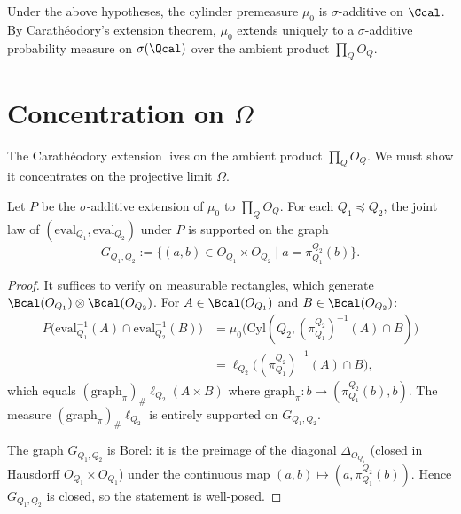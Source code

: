 \begin{corollary}
Under the above hypotheses, the cylinder premeasure $\mu_0$ is
$\sigma$-additive on $\Ccal$.  By Carath\'eodory's extension theorem,
$\mu_0$ extends uniquely to a $\sigma$-additive probability measure
on $\sigma(\Qcal)$ over the ambient product $\prod_Q O_Q$.
\end{corollary}

\section{Concentration on $\Omega$}\label{sec:concentration}

The Carath\'eodory extension lives on the ambient product
$\prod_Q O_Q$.  We must show it concentrates on the projective limit
$\Omega$.

\begin{lemma}
\label{lem:graph-support}
Let $P$ be the $\sigma$-additive extension of $\mu_0$ to
$\prod_Q O_Q$.  For each $Q_1 \preceq Q_2$, the joint law of
$(\mathrm{eval}_{Q_1}, \mathrm{eval}_{Q_2})$ under $P$ is supported
on the graph
\[
G_{Q_1,Q_2}
:=
\bigl\{
(a,b) \in O_{Q_1} \times O_{Q_2}
\;\big|\;
a = \pi^{Q_2}_{Q_1}(b)
\bigr\}.
\]
\end{lemma}

\begin{proof}
It suffices to verify on measurable rectangles, which generate
$\Bcal(O_{Q_1}) \otimes \Bcal(O_{Q_2})$.  For $A \in \Bcal(O_{Q_1})$
and $B \in \Bcal(O_{Q_2})$:
\begin{align*}
P\bigl(
\mathrm{eval}_{Q_1}^{-1}(A) \cap \mathrm{eval}_{Q_2}^{-1}(B)
\bigr)
&= \mu_0\bigl(\mathrm{Cyl}(Q_2, (\pi^{Q_2}_{Q_1})^{-1}(A) \cap B)\bigr) \\
&= \ell_{Q_2}\bigl((\pi^{Q_2}_{Q_1})^{-1}(A) \cap B\bigr),
\end{align*}
which equals $(\mathrm{graph}_\pi)_\# \ell_{Q_2}(A \times B)$
where $\mathrm{graph}_\pi : b \mapsto (\pi^{Q_2}_{Q_1}(b), b)$.
The measure $(\mathrm{graph}_\pi)_\# \ell_{Q_2}$ is entirely
supported on $G_{Q_1,Q_2}$.

The graph $G_{Q_1,Q_2}$ is Borel: it is the preimage of the diagonal
$\Delta_{O_{Q_1}}$ (closed in Hausdorff $O_{Q_1} \times O_{Q_1}$)
under the continuous map $(a,b) \mapsto (a, \pi^{Q_2}_{Q_1}(b))$.
Hence $G_{Q_1,Q_2}$ is closed, so the statement is well-posed.
\end{proof}

